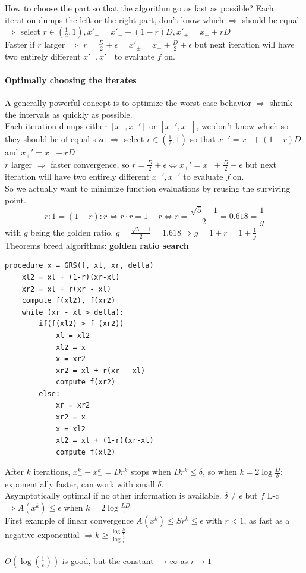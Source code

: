 \documentclass[10pt]{report}
\begin{document}
How to choose the part so that the algorithm go as fast as possible? Each iteration dumps the left or the right part, don't know which $\Rightarrow$ should be equal $\Rightarrow$ select $r \in (\frac{1}{2}, 1), x'_- = x'_- + (1 - r)D, x'_+ = x_- + rD$\\
Faster if $r$ larger $\Rightarrow$ $r = \frac{D}{2} + \epsilon = x'_\pm = x_- + \frac{D}{2} \pm \epsilon$ but next iteration will have two entirely different $x'_-, x'_+$ to evaluate $f$ on.
\paragraph{Optimally choosing the iterates} A generally powerful concept is to optimize the worst-case behavior $\Rightarrow$ shrink the intervals as quickly as possible.\\
Each iteration dumps either $[x_-, x_-']$ or $[x_+', x_+]$, we don't know which so they should be of equal size $\Rightarrow$ select $r\in (\frac{1}{2},1)$ so that $x_-' = x_- + (1-r)D$ and $x_+' = x_- + rD$\\
$r$ larger $\Rightarrow$ faster convergence, so $r = \frac{D}{2} + \epsilon \Leftrightarrow x_\pm' = x_- + \frac{D}{2}\pm\epsilon$ but next iteration will have two entirely different $x_-', x_+'$ to evaluate $f$ on.\\
So we actually want to minimize function evaluations by reusing the surviving point. $$r : 1 = (1 - r) : r \Leftrightarrow r\cdot r = 1 - r \Leftrightarrow r = \frac{\sqrt{5} - 1}{2} = 0.618 = \frac{1}{g}$$ with $g$ being the golden ratio, $g = \frac{\sqrt{5} + 1}{2} = 1.618 \Rightarrow g = 1 + r = 1 + \frac{1}{g}$\\
Theorems breed algorithms: \textbf{golden ratio search}\\
\begin{lstlisting}[style=myPython]
procedure x = GRS(f, xl, xr, delta)
	xl2 = xl + (1-r)(xr-xl)
	xr2 = xl + r(xr - xl)
	compute f(xl2), f(xr2)
	while (xr - xl > delta):
		if(f(xl2) > f (xr2))
			xl = xl2
			xl2 = x
			x = xr2
			xr2 = xl + r(xr - xl)
			compute f(xr2)
		else:
			xr = xr2
			xr2 = x
			x = xl2
			xl2 = xl + (1-r)(xr-xl)
			compute f(xl2)
\end{lstlisting}
After $k$ iterations, $x_+^k - x_-^k = Dr^k$ stops when $Dr^k \leq \delta$, so when $k = 2\log\frac{D}{\delta}$: exponentially faster, can work with small $\delta$.\\
Asymptotically optimal if no other information is available. $\delta \neq \epsilon$ but $f$ L-c $\Rightarrow A(x^k) \leq \epsilon$ when $k = 2\log\frac{LD}{\epsilon}$\\
First example of linear convergence $A(x^k) \leq Sr^k \leq \epsilon$ with $r < 1$, as fast as a negative exponential $\Rightarrow k \geq \frac{\displaystyle \log\frac{S}{\epsilon}}{\displaystyle \log\frac{1}{r}}$\\\\
$O(\log(\frac{1}{\epsilon}))$ is good, but the constant $\rightarrow\infty$ as $r\rightarrow 1$
\end{document}
